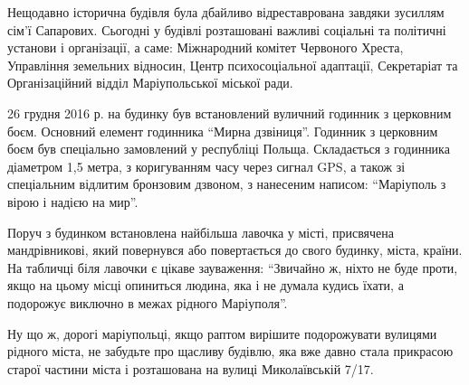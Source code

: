 
Нещодавно історична будівля була дбайливо відреставрована завдяки зусиллям
сім’ї Сапарових. Сьогодні у будівлі розташовані важливі соціальні та політичні
установи і організації, а саме: Міжнародний комітет Червоного Хреста,
Управління земельних відносин, Центр психосоціальної адаптації, Секретаріат та
Організаційний відділ Маріупольської міської ради. 


26 грудня 2016 р. на будинку був встановлений вуличний годинник з церковним
боєм. Основний елемент годинника \enquote{Мирна дзвіниця}. Годинник з церковним
боєм був спеціально замовлений у республіці Польща. Складається з годинника
діаметром 1,5 метра, з коригуванням часу через сигнал GPS, а також зі
спеціальним відлитим бронзовим дзвоном, з нанесеним написом: \enquote{Маріуполь
з вірою і надією на мир}.

Поруч з будинком встановлена найбільша лавочка у місті, присвячена
мандрівникові, який повернувся або повертається до свого будинку, міста,
країни. На табличці біля лавочки є цікаве зауваження: \enquote{Звичайно ж,
ніхто не буде проти, якщо на цьому місці опиниться людина, яка і не думала
кудись їхати, а подорожує виключно в межах рідного Маріуполя}.


Ну що ж, дорогі маріупольці, якщо раптом вирішите подорожувати вулицями рідного
міста, не забудьте про щасливу будівлю, яка вже давно стала прикрасою старої
частини міста і розташована на вулиці Миколаївській 7/17.

